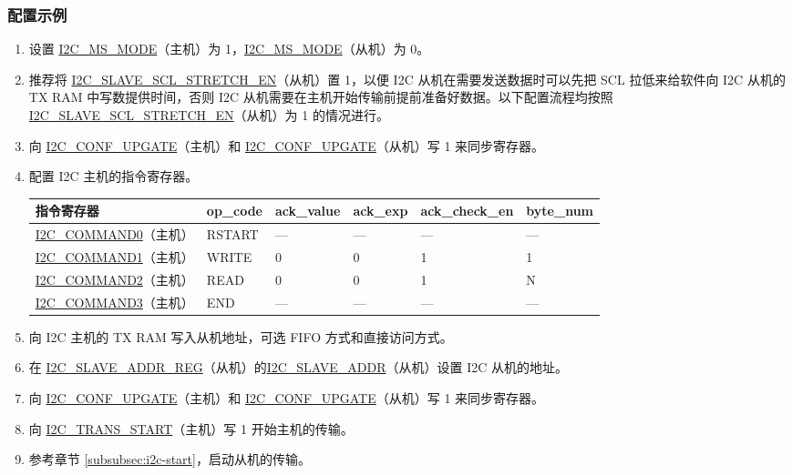 \documentclass[main\_\_CN.tex]{subfiles}
\begin{document}
\subsubsection{配置示例}
\begin{enumerate}
\item 设置 \hyperref[fielddesc:I2CMSMODE]{I2C\_MS\_MODE}（主机）为 1，\hyperref[fielddesc:I2CMSMODE]{I2C\_MS\_MODE}（从机）为 0。
\item 推荐将 \hyperref[fielddesc:I2CSLAVESCLSTRETCHEN]{I2C\_SLAVE\_SCL\_STRETCH\_EN}（从机）置 1，以便 I2C 从机在需要发送数据时可以先把 SCL 拉低来给软件向 I2C 从机的 TX RAM 中写数提供时间，否则 I2C 从机需要在主机开始传输前提前准备好数据。以下配置流程均按照 \hyperref[fielddesc:I2CSLAVESCLSTRETCHEN]{I2C\_SLAVE\_SCL\_STRETCH\_EN}（从机）为 1 的情况进行。
\item 向 \hyperref[fielddesc:I2CCONFUPGATE]{I2C\_CONF\_UPGATE}（主机）和 \hyperref[fielddesc:I2CCONFUPGATE]{I2C\_CONF\_UPGATE}（从机）写 1 来同步寄存器。
\item 配置 I2C 主机的指令寄存器。
\begin{longtable}{ | p{4cm} | p{2cm} | p{2cm} | p{2cm} |p{2cm} | p{2cm} |}
\hline\rowcolor{lightgray}
指令寄存器& op\_code & ack\_value&ack\_exp&ack\_check\_en&byte\_num  \\ \hline
\hyperref[fielddesc:I2CCOMMAND0]{I2C\_COMMAND0}（主机）& RSTART& ---&---&---&---  \\ \hline
\hyperref[fielddesc:I2CCOMMAND1]{I2C\_COMMAND1}（主机）& WRITE& 0&0&1&1  \\ \hline
\hyperref[fielddesc:I2CCOMMAND2]{I2C\_COMMAND2}（主机）& READ& 0&0&1&N  \\ \hline
\hyperref[fielddesc:I2CCOMMAND3]{I2C\_COMMAND3}（主机）& END& ---&---&---&---  \\ \hline
\end{longtable}
\item 向 I2C 主机的 TX RAM 写入从机地址，可选 FIFO 方式和直接访问方式。
\item 在 \hyperref[regdesc:I2CSLAVEADDRREG]{I2C\_SLAVE\_ADDR\_REG}（从机）的\hyperref[fielddesc:I2CSLAVEADDR]{I2C\_SLAVE\_ADDR}（从机）设置 I2C 从机的地址。
\item 向 \hyperref[fielddesc:I2CCONFUPGATE]{I2C\_CONF\_UPGATE}（主机）和 \hyperref[fielddesc:I2CCONFUPGATE]{I2C\_CONF\_UPGATE}（从机）写 1 来同步寄存器。
\item 向 \hyperref[fielddesc:I2CTRANSSTART]{I2C\_TRANS\_START}（主机）写 1 开始主机的传输。
\item 参考章节 \ref{subsubsec:i2c-start}，启动从机的传输。

\end{enumerate}
\end{document}
